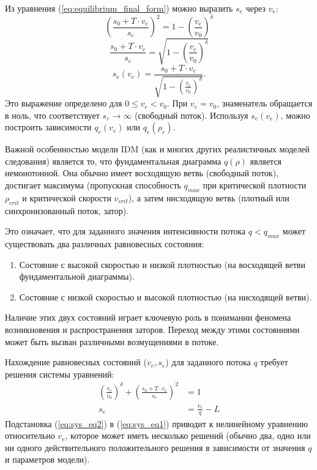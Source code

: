 \documentclass[12pt, a4paper]{article}
\begin{document}
Из уравнения (\ref{eq:equilibrium_final_form}) можно выразить $s_e$ через $v_e$:
\[ \left( \frac{s_0 + T \cdot v_e}{s_e} \right)^2 = 1 - \left(\frac{v_e}{v_0}\right)^\delta \]
\[ \frac{s_0 + T \cdot v_e}{s_e} = \sqrt{1 - \left(\frac{v_e}{v_0}\right)^\delta} \]
\begin{equation}
\label{eq:se_from_ve}
s_e(v_e) = \frac{s_0 + T \cdot v_e}{\sqrt{1 - \left(\frac{v_e}{v_0}\right)^\delta}}.
\end{equation}
Это выражение определено для $0 \le v_e < v_0$. При $v_e = v_0$, знаменатель обращается в ноль, что соответствует $s_e \to \infty$ (свободный поток).
Используя $s_e(v_e)$, можно построить зависимости $q_e(v_e)$ или $q_e(\rho_e)$.

Важной особенностью модели IDM (как и многих других реалистичных моделей следования) является то, что фундаментальная диаграмма $q(\rho)$ является немонотонной. Она обычно имеет восходящую ветвь (свободный поток), достигает максимума (пропускная способность $q_{max}$ при критической плотности $\rho_{crit}$ и критической скорости $v_{crit}$), а затем нисходящую ветвь (плотный или синхронизованный поток, затор).

Это означает, что для заданного значения интенсивности потока $q < q_{max}$ может существовать два различных равновесных состояния:
\begin{enumerate}
    \item Состояние с высокой скоростью и низкой плотностью (на восходящей ветви фундаментальной диаграммы).
    \item Состояние с низкой скоростью и высокой плотностью (на нисходящей ветви).
\end{enumerate}
Наличие этих двух состояний играет ключевую роль в понимании феномена возникновения и распространения заторов. Переход между этими состояниями может быть вызван различными возмущениями в потоке.

Нахождение равновесных состояний ($v_e, s_e$) для заданного потока $q$ требует решения системы уравнений:
\begin{align}
\left(\frac{v_e}{v_0}\right)^\delta + \left( \frac{s_0 + T \cdot v_e}{s_e} \right)^2 &= 1 \label{eq:sys_eq1} \\
s_e &= \frac{v_e}{q} - L \label{eq:sys_eq2}
\end{align}
Подстановка (\ref{eq:sys_eq2}) в (\ref{eq:sys_eq1}) приводит к нелинейному уравнению относительно $v_e$, которое может иметь несколько решений (обычно два, одно или ни одного действительного положительного решения в зависимости от значения $q$ и параметров модели).
\end{document}
